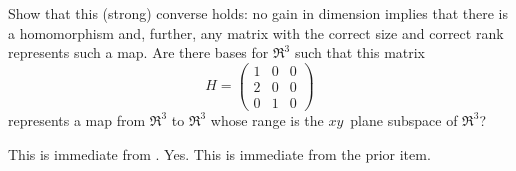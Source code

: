 \begin{exercises}
\begin{exparts}
       \partsitem Show that this (strong) converse holds: 
          no gain in dimension implies that 
          there is a homomorphism and, further, 
          any matrix with the correct size and correct rank 
          represents such a map.
       \partsitem Are there bases for $\Re^3$ such that
          this matrix
          \begin{equation*}
            H=\begin{pmatrix}
                1  &0  &0 \\
                2  &0  &0 \\
                0  &1  &0 
              \end{pmatrix}
          \end{equation*}
          represents a map from $\Re^3$ to $\Re^3$ whose range is
          the $xy$~plane subspace of $\Re^3$?
     \end{exparts}
     \begin{answer}
       \begin{exparts}
         \partsitem  This is immediate from
           .
         \partsitem Yes.
            This is immediate from the prior item.


\end{exparts}
\end{answer}
\end{exercises}
